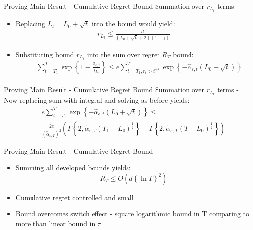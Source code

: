 \documentclass{beamer}
\begin{document}
\begin{frame}{Proving Main Result - Cumulative Regret Bound}
Summation over $r_{L_t}$ terms - \newline\newline
\begin{itemize}
\item Replacing $L_t=L_0+\sqrt{t}$ into the bound would yield:
\begin{eqnarray*}
r_{L_t}\leq\frac{d}{\left(L_0+\sqrt{t}+2\right)\left(1-\gamma\right)}
\end{eqnarray*}
\item Substituting bound $r_{L_t}$ into the sum over regret $R_T$ bound: 
\begin{eqnarray*}
&&\sum\limits_{t=T_1}^{T}\exp\left\{1-\frac{\alpha_{\varepsilon,t}}{r_{L_t}}\right\}\leq e\sum\limits_{t=T_1,r_t> t^{-\kappa}}^{T}\exp\left\{-\hat{\alpha}_{\varepsilon,t}\left(L_0+\sqrt{t}\right)\right\}\nonumber\\
\end{eqnarray*}
\end{itemize}
\end{frame}



\begin{frame}{Proving Main Result - Cumulative Regret Bound}
Summation over $r_{L_t}$ terms - \newline\newline
Now replacing sum with integral and solving as before yields:
\begin{eqnarray*}
&&e\sum\limits_{t=T_1}^{T}\exp\left\{-\hat{\alpha}_{\varepsilon,t}\left(L_0+\sqrt{t}\right)\right\}\leq\\
&&\frac{2e}{\left(\tilde{\alpha}_{\varepsilon,T}\right)^{2}}\left(\Gamma\left\{2,\tilde{\alpha}_{\varepsilon,T}\left(T_{1}-L_0\right)^{\frac{1}{2}}\right\}-\Gamma\left\{2,\tilde{\alpha}_{\varepsilon,T}\left(T-L_0\right)^{\frac{1}{2}}\right\}\right)\nonumber
\end{eqnarray*}
\end{frame}


\begin{frame}{Proving Main Result - Cumulative Regret Bound}
\begin{itemize}
\item Summing all developed bounds yields:
\begin{equation*}
 R_T\leq O\left(d\left\{\ln{T}\right\}^2\right)
\end{equation*}
\item Cumulative regret controlled and small\newline
\item Bound overcomes switch effect - square logarithmic bound in T comparing to more than linear bound in $\tau$
\end{itemize}

\end{frame}
\end{document}
